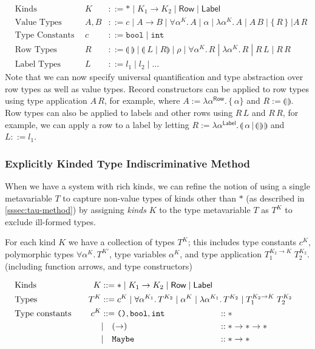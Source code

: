 \documentclass[acmsmall, 9pt]{article}
\begin{document}
\begin{enumerate}
  \begin{align*}
  &\text{Kinds} \quad &K &::= * \; | \; K_1 \rightarrow K_2 \; | \; \mathsf{Row} \; | \; \mathsf{Label}\\
  &\text{Value Types} \quad  &A, B &::= c \; | \; A \rightarrow B \; | \; \forall \alpha^K . \, A\; | \; \alpha \; | \; \lambda \alpha^K. \, A \; | \; A \, B \; | \; \{\,R\,\} \; | A \, R\\
  &\text{Type Constants} \quad &c &::= \texttt{bool} \; | \; \texttt{int}\\
  &\text{Row Types} \quad &R &::= \llparenthesis \; \rrparenthesis \; | \; \llparenthesis \; L \; | \; R \rrparenthesis \; | \; \rho \; | \; \forall \alpha^K . \, R \; | \; \lambda \alpha^K. \, R \; | \; R \, L \; | \; R \, R\\
  &\text{Label Types} \quad &L &::= l_1 \; | \; l_2 \; | \; \ldots
  \end{align*}
  Note that we can now specify universal quantification and type abstraction over row types as well as value types. Record constructors can be applied to row types using type application $A\,R$, for example, where $A := \lambda\alpha^\mathsf{Row}.\,\{\,\alpha\}$ and $R := \llparenthesis \, \rrparenthesis$. Row types can also be applied to labels and other rows using $R\,L$ and $R\,R$, for example, we can apply a row to a label by letting $R := \lambda \alpha^\mathsf{Label}. \, \llparenthesis \, \alpha \, | \, \llparenthesis \, \rrparenthesis \, \rrparenthesis$ and $L ::= l_1$.
\end{enumerate}

\subsubsection{\textbullet \; Explicitly Kinded Type Indiscriminative Method \cite{leijen2005extensible}}
When we have a system with rich kinds, we can refine the notion of using a single metavariable $T$ to capture non-value types of kinds other than $*$ (as described in \ref{sssec:tau-method}) by assigning \textit{kinds} $K$ to the type metavariable $T$ as $T^K$ to exclude ill-formed types.

For each kind $K$ we have a collection of types $T^K$; this includes type constants $c^K$, polymorphic types $\forall \alpha^K . \, T^{K'}$, type variables $\alpha^K$, and type application $T_1^{K_2 \rightarrow K} \; T_2^{K_2}$. (including function arrows, and type constructors)

\begin{align*}
  &\text{Kinds} \quad &K &::= * \; | \; K_1 \rightarrow K_2 \; | \; \mathsf{Row} \; | \; \mathsf{Label} \\
  &\text{Types} \quad &T^K &::= c^K \; | \; \forall \alpha^{K_1} . \, T^{K_2}\; | \; \alpha^K \; | \; \lambda \alpha^{K_1}. \, T^{K_2} \; |  \; T_1^{K_2 \rightarrow K} \; T_2^{K_2} \span\span\\
  &\text{Type constants} \quad &c^K &::= \texttt{()}, \texttt{bool}, \texttt{int} &::& \; *\\
  &&&| \quad (\rightarrow) &::& \; * \rightarrow * \rightarrow * \\
  &&&| \quad \texttt{Maybe} &::& \; * \rightarrow *
\end{align*}
\end{document}
